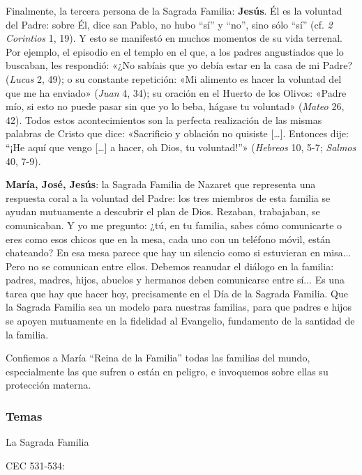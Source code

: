 \documentclass[]{article}
\begin{document}
Finalmente, la tercera persona de la Sagrada Familia: \textbf{Jesús}. Él
es la voluntad del Padre: sobre Él, dice san Pablo, no hubo ``sí'' y
``no'', sino sólo ``sí'' (cf. \emph{2 Corintios} 1, 19). Y esto se
manifestó en muchos momentos de su vida terrenal. Por ejemplo, el
episodio en el templo en el que, a los padres angustiados que lo
buscaban, les respondió: «¿No sabíais que yo debía estar en la casa de
mi Padre? (\emph{Lucas} 2, 49); o su constante repetición: «Mi alimento
es hacer la voluntad del que me ha enviado» (\emph{Juan} 4, 34); su
oración en el Huerto de los Olivos: «Padre mío, si esto no puede pasar
sin que yo lo beba, hágase tu voluntad» (\emph{Mateo} 26, 42). Todos
estos acontecimientos son la perfecta realización de las mismas palabras
de Cristo que dice: «Sacrificio y oblación no quisiste [\ldots{}].
Entonces dije: ``¡He aquí que vengo [\ldots{}] a hacer, oh Dios, tu
voluntad!''» (\emph{Hebreos} 10, 5-7; \emph{Salmos} 40, 7-9).

\textbf{María, José, Jesús}: la Sagrada Familia de Nazaret que
representa una respuesta coral a la voluntad del Padre: los tres
miembros de esta familia se ayudan mutuamente a descubrir el plan de
Dios. Rezaban, trabajaban, se comunicaban. Y yo me pregunto: ¿tú, en tu
familia, sabes cómo comunicarte o eres como esos chicos que en la mesa,
cada uno con un teléfono móvil, están chateando? En esa mesa parece que
hay un silencio como si estuvieran en misa... Pero no se comunican entre
ellos. Debemos reanudar el diálogo en la familia: padres, madres, hijos,
abuelos y hermanos deben comunicarse entre sí... Es una tarea que hay
que hacer hoy, precisamente en el Día de la Sagrada Familia. Que la
Sagrada Familia sea un modelo para nuestras familias, para que padres e
hijos se apoyen mutuamente en la fidelidad al Evangelio, fundamento de
la santidad de la familia.

Confiemos a María ``Reina de la Familia'' todas las familias del mundo,
especialmente las que sufren o están en peligro, e invoquemos sobre
ellas su protección materna.

\protect\hypertarget{_Toc448708372}{}{\protect\hypertarget{_Toc448709458}{}{\protect\hypertarget{_Toc449554460}{}{}}}

\subsubsection{Temas}\label{temas-8}

La Sagrada Familia

CEC 531-534:
\end{document}
